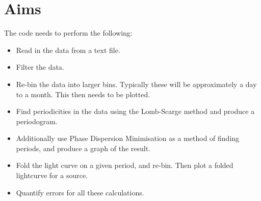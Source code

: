 \section{Aims}
The code needs to perform the following:
\begin{itemize}
\item Read in the data from a text file.
\item Filter the data.
\item Re-bin the data into larger bins. Typically these will be approximately a day to a month. This then needs to be plotted.
\item Find periodicities in the data using the Lomb-Scarge method and produce a periodogram.
\item Additionally use Phase Dispersion Minimisation as a method of finding periods, and produce a graph of the result.
\item Fold the light curve on a given period, and re-bin. Then plot a folded lightcurve for a source.
\item Quantify errors for all these calculations.
\end{itemize}